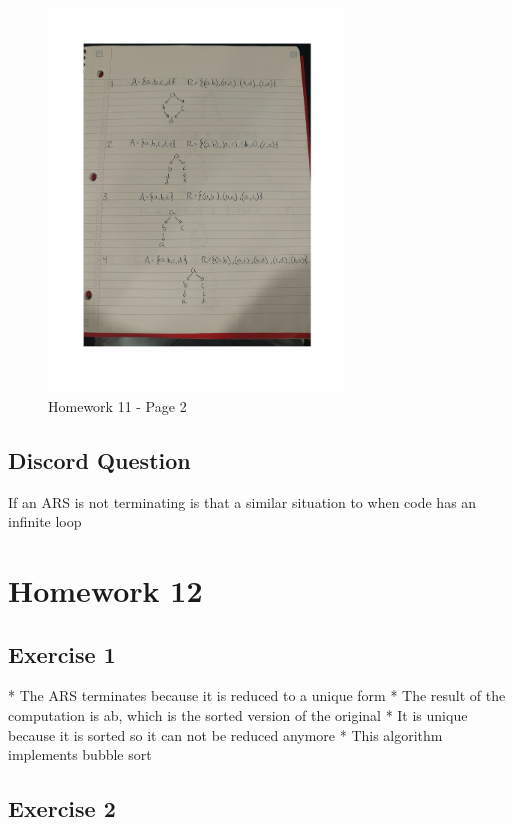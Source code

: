 \documentclass{article}
\theoremstyle{plain}
\theoremstyle{definition}
\theoremstyle{remark}
\begin{document}
\begin{figure}[H]
  \centering
  \includegraphics[width=0.7\textwidth, page=2]{HW11.pdf}
  \caption{Homework 11 - Page 2}
  \label{fig:homework11_page2}
\end{figure}


\subsection{Discord Question}

If an ARS is not terminating is that a similar situation to when code has an infinite loop


\section{Homework 12}\label{homework12}

\subsection{Exercise 1}

* The ARS terminates because it is reduced to a unique form 
* The result of the computation is ab, which is the sorted version of the original
* It is unique because it is sorted so it can not be reduced anymore
* This algorithm implements bubble sort

\subsection{Exercise 2}
\end{document}
